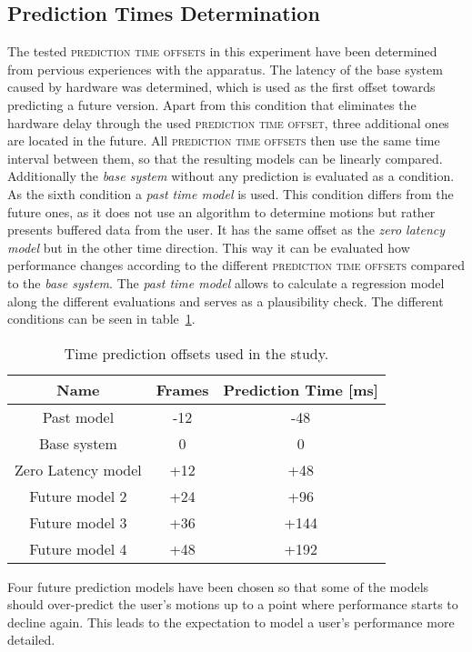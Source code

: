 \documentclass[sigconf]{acmart}
\begin{document}
\subsection{Prediction Times Determination}
The tested \textsc{prediction time offsets} in this experiment have been determined from pervious experiences with the apparatus. The latency of the base system caused by hardware was determined, which is used as the first offset towards predicting a future version. Apart from this condition that eliminates the hardware delay through the used \textsc{prediction time offset}, three additional ones are located in the future. All \textsc{prediction time offsets} then use the same time interval between them, so that the resulting models can be linearly compared. Additionally the \textit{base system} without any prediction is evaluated as a condition. As the sixth condition a \textit{past time model} is used. This condition differs from the future ones, as it does not use an algorithm to determine motions but rather presents buffered data from the user. It has the same offset as the \textit{zero latency model} but in the other time direction. This way it can be evaluated how performance changes according to the different \textsc{prediction time offsets} compared to the \textit{base system}.
The \textit{past time model} allows to calculate a regression model along the different evaluations and serves as a plausibility check.
The different conditions can be seen in table~\ref{table:tableTimePredictionOffsets}.

\begin{table}
\caption{Time prediction offsets used in the study.}
\begin{tabular}{ccc} 
\hline
	Name & Frames & Prediction Time [ms] \\
\hline
Past model &  -12 & -48 \\ 
Base system & 0 & 0 \\
Zero Latency model & +12 & +48 \\
Future model 2 & +24 & +96 \\
Future model 3 & +36 & +144 \\
Future model 4 & +48 & +192 \\
\hline
\end{tabular}
\label{table:tableTimePredictionOffsets}
\end{table}

Four future prediction models have been chosen so that some of the models should over-predict the user's motions up to a point where performance starts to decline again. This leads to the expectation to model a user's performance more detailed.
\end{document}
